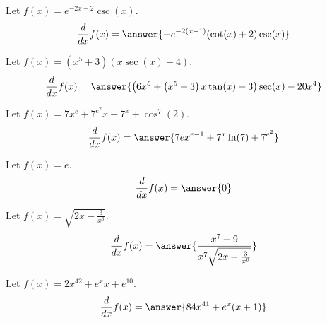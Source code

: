 \documentclass{ximera}
\begin{document}
\begin{shuffle}
\begin{exercise}
Let $f(x)=e^{-2 x-2} \csc (x)$.
\[
\ddx f(x) = \answer{-e^{-2 (x+1)} (\cot (x)+2) \csc (x)}
\]
\end{exercise}


\begin{exercise}
Let $f(x)=\left(x^5+3\right) (x \sec (x)-4)$.
\[
\ddx f(x) = \answer{\left(6 x^5+\left(x^5+3\right) x \tan (x)+3\right) \sec (x)-20 x^4}
\]
\end{exercise}

\begin{exercise}
Let $f(x)=7 x^e+7^{e^2} x+7^x+\cos ^7(2)$.
\[
\ddx f(x) = \answer{7 e x^{e-1}+7^x \ln (7)+7^{e^2}}
\]
\end{exercise}



\begin{exercise}
Let $f(x)=e$.
\[
\ddx f(x) = \answer{0}
\]
\end{exercise}

\begin{exercise}
Let $f(x)=\sqrt{2 x-\frac{3}{x^6}}$.
\[
\ddx f(x) = \answer{\frac{x^7+9}{x^7 \sqrt{2 x-\frac{3}{x^6}}}}
\]
\end{exercise}

\begin{exercise}
Let $f(x)=2 x^{42}+e^x x+e^{10}$.
\[
\ddx f(x) = \answer{84 x^{41}+e^x (x+1)}
\]
\end{exercise}


\end{shuffle}
\end{document}
